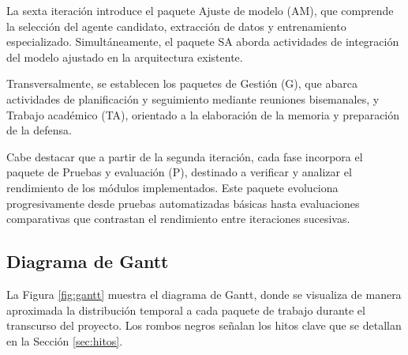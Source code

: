 La sexta iteración introduce el paquete Ajuste de modelo (AM), que comprende la selección del agente candidato, extracción de datos y entrenamiento especializado. Simultáneamente, el paquete SA aborda actividades de integración del modelo ajustado en la arquitectura existente.

Transversalmente, se establecen los paquetes de Gestión (G), que abarca actividades de planificación y seguimiento mediante reuniones bisemanales, y Trabajo académico (TA), orientado a la elaboración de la memoria y preparación de la defensa.

Cabe destacar que a partir de la segunda iteración, cada fase incorpora el paquete de Pruebas y evaluación (P), destinado a verificar y analizar el rendimiento de los módulos implementados. Este paquete evoluciona progresivamente desde pruebas automatizadas básicas hasta evaluaciones comparativas que contrastan el rendimiento entre iteraciones sucesivas.

\subsection{Diagrama de Gantt}

La Figura \ref{fig:gantt} muestra el diagrama de Gantt, donde se visualiza de manera aproximada la distribución temporal a cada paquete de trabajo durante el transcurso del proyecto. Los rombos negros señalan los hitos clave que se detallan en la Sección \ref{sec:hitos}.


